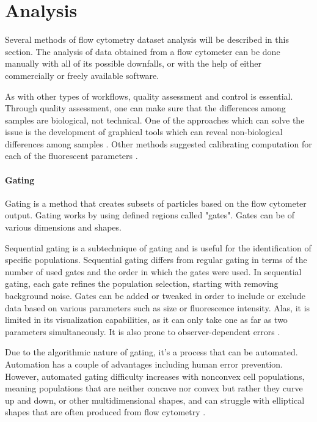 \section{Analysis}
\label{sec:analviagating}
Several methods of flow cytometry dataset analysis will be described in this section.
The analysis of data obtained from a flow cytometer can be done manually with all of its possible downfalls, or with the help of either commercially or freely available software. 

As with other types of workflows, quality assessment and control is essential. Through quality assessment, one can make sure that the differences among samples are biological, not technical. One of the approaches which can solve the issue is the development of graphical tools which can reveal non-biological differences among samples \citep{le2007data}. Other methods suggested calibrating computation for each of the fluorescent parameters \citep{gratama1998flow}.

\paragraph{Gating}
\label{sec:gating}
Gating is a method that creates subsets of particles based on the flow cytometer output. Gating works by using defined regions called "gates". Gates can be of various dimensions and shapes.

Sequential gating is a subtechnique of gating and is useful for the identification of specific populations. Sequential gating differs from regular gating in terms of the number of used gates and the order in which the gates were used. In sequential gating, each gate refines the population selection, starting with removing background noise. Gates can be added or tweaked in order to include or exclude data based on various parameters such as size or fluorescence intensity. Alas, it is limited in its visualization capabilities, as it can only take one as far as two parameters simultaneously. It is also prone to observer-dependent errors \citep{herzenberg2006interpreting}.

Due to the algorithmic nature of gating, it's a process that can be automated. Automation has a couple of advantages including human error prevention. However, automated gating difficulty increases with nonconvex cell populations, meaning populations that are neither concave nor convex but rather they curve up and down, or other multidimensional shapes, and can struggle with elliptical shapes that are often produced from flow cytometry \cite{finak2009merging}.

